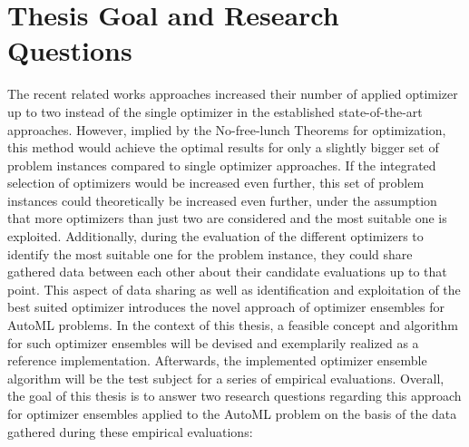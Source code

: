 \section{Thesis Goal and Research Questions}
\label{sec:intro:goal}
The recent related works approaches increased their number of applied optimizer up to two instead of the single optimizer in the established state-of-the-art approaches.
However, implied by the No-free-lunch Theorems for optimization, this method would achieve the optimal results for only a slightly bigger set of problem instances compared to single optimizer approaches.\newline
If the integrated selection of optimizers would be increased even further, this set of problem instances could theoretically be increased even further, under the assumption that more optimizers than just two are considered and the most suitable one is exploited.
Additionally, during the evaluation of the different optimizers to identify the most suitable one for the problem instance, they could share gathered data between each other about their candidate evaluations up to that point.\newline
This aspect of data sharing as well as identification and exploitation of the best suited optimizer introduces the novel approach of optimizer ensembles for AutoML problems.
In the context of this thesis, a feasible concept and algorithm for such optimizer ensembles will be devised and exemplarily realized as a reference implementation.
Afterwards, the implemented optimizer ensemble algorithm will be the test subject for a series of empirical evaluations.\newline
Overall, the goal of this thesis is to answer two research questions regarding this approach for optimizer ensembles applied to the AutoML problem on the basis of the data gathered during these empirical evaluations:
